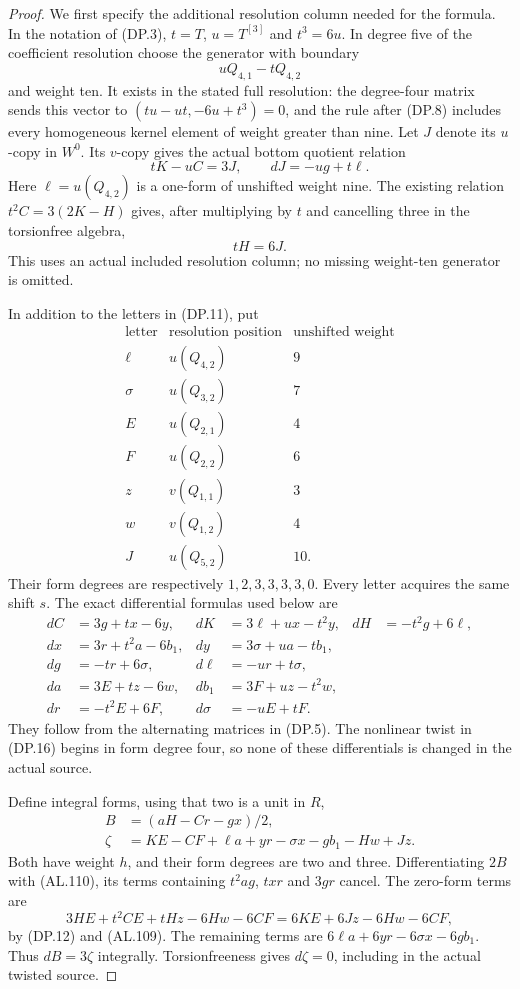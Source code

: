 \begin{proof}
We first specify the additional resolution column needed
for the formula. In the notation of (DP.3), $t=T$,
$u=T^{[3]}$ and $t^3=6u$. In degree five of the
coefficient resolution choose the generator with boundary
\[
                     u Q_{4,1}-t Q_{4,2}
\]
and weight ten. It exists in the stated full resolution:
the degree-four matrix sends this vector to
$(tu-ut,-6u+t^3)=0$, and the rule after (DP.8) includes
every homogeneous kernel element of weight greater than nine.
Let $J$ denote its $u$-copy in $W^0$.
Its $v$-copy gives the actual bottom quotient relation
\[
 tK-uC=3J,\qquad dJ=-ug+t\ell.
 \tag{AL.108}
\]
Here $\ell=u(Q_{4,2})$ is a one-form of unshifted weight nine.
The existing relation $t^2C=3(2K-H)$ gives, after multiplying
by $t$ and cancelling three in the torsionfree algebra,
\[
                              tH=6J.
 \tag{AL.109}
\]
This uses an actual included resolution column; no missing
weight-ten generator is omitted.

In addition to the letters in (DP.11), put
\[
\begin{array}{c|c|c}
\text{letter}&\text{resolution position}&\text{unshifted weight}\\\hline
\ell&u(Q_{4,2})&9\\
\sigma&u(Q_{3,2})&7\\
E&u(Q_{2,1})&4\\
F&u(Q_{2,2})&6\\
z&v(Q_{1,1})&3\\
w&v(Q_{1,2})&4\\
J&u(Q_{5,2})&10.
\end{array}
\]
Their form degrees are respectively $1,2,3,3,3,3,0$.
Every letter acquires the same shift $s$.
The exact differential formulas used below are
\[
\begin{aligned}
dC&=3g+tx-6y,&dK&=3\ell+ux-t^2y,&dH&=-t^2g+6\ell,\\
dx&=3r+t^2a-6b_1,&dy&=3\sigma+ua-tb_1,\\
dg&=-tr+6\sigma,&d\ell&=-ur+t\sigma,\\
da&=3E+tz-6w,&db_1&=3F+uz-t^2w,\\
dr&=-t^2E+6F,&d\sigma&=-uE+tF.
\end{aligned}
 \tag{AL.110}
\]
They follow from the alternating matrices in (DP.5).
The nonlinear twist in (DP.16) begins in form degree four,
so none of these differentials is changed in the actual source.

Define integral forms, using that two is a unit in $R$,
\[
\begin{split}
B&=(aH-Cr-gx)/2,\\
\zeta&=KE-CF+\ell a+yr-\sigma x-gb_1-Hw+Jz.
\end{split}
 \tag{AL.111}
\]
Both have weight $h$, and their form degrees are two and
three. Differentiating $2B$ with (AL.110), its terms containing
$t^2ag$, $txr$ and $3gr$ cancel. The zero-form terms are
\[
 3HE+t^2CE+tHz-6Hw-6CF
       =6KE+6Jz-6Hw-6CF,
\]
by (DP.12) and (AL.109). The remaining terms are
$6\ell a+6yr-6\sigma x-6gb_1$.
Thus $dB=3\zeta$ integrally. Torsionfreeness gives
$d\zeta=0$, including in the actual twisted source.


\end{proof}
